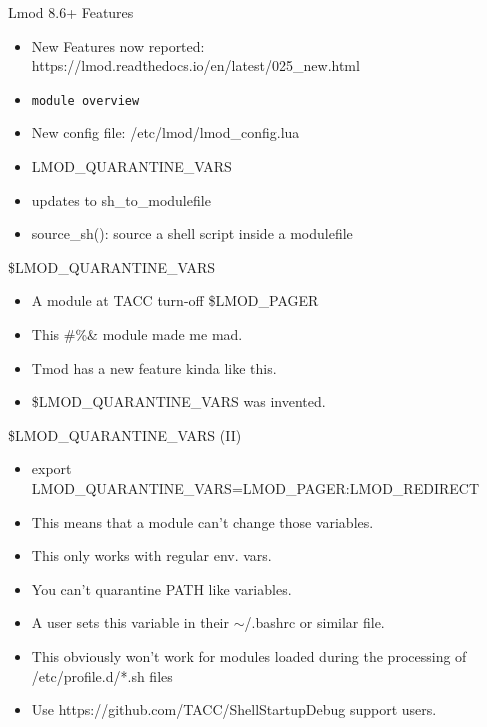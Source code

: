 \documentclass{beamer}
\begin{document}
\begin{frame}{Lmod 8.6+ Features}
  \begin{itemize}
    \item New Features now reported:
      https://lmod.readthedocs.io/en/latest/025_new.html
    \item \texttt{module overview}
    \item New config file: /etc/lmod/lmod\_config.lua
    \item LMOD_QUARANTINE_VARS
    \item updates to sh_to_modulefile
    \item source_sh(): source a shell script inside a modulefile
  \end{itemize}
\end{frame}

\begin{frame}{\$LMOD\_QUARANTINE\_VARS}
  \begin{itemize}
    \item A module at TACC turn-off  \$LMOD\_PAGER
    \item This \!\@\#\%\& module made me mad.
    \item Tmod has a new feature kinda like this.
    \item \$LMOD\_QUARANTINE\_VARS was invented.
  \end{itemize}
\end{frame}

\begin{frame}{\$LMOD\_QUARANTINE\_VARS (II)}
  \begin{itemize}
    \item export LMOD\_QUARANTINE\_VARS=LMOD\_PAGER:LMOD\_REDIRECT
    \item This means that a module can't change those variables.
    \item This only works with regular env. vars.
    \item You can't quarantine PATH like variables.
    \item A user sets this variable in their $\sim$/.bashrc or similar
      file.
    \item This obviously won't work for modules loaded during the
      processing of /etc/profile.d/*.sh files
    \item Use https://github.com/TACC/ShellStartupDebug support users.
  \end{itemize}
\end{frame}
\end{document}
